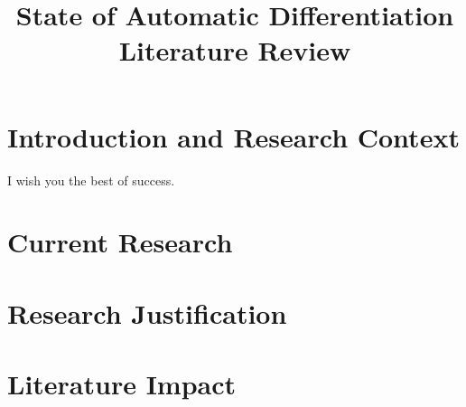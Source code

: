 \documentclass[conference,a4paper]{IEEEtran}
\begin{document}
\title{State of Automatic Differentiation\\ Literature Review}

\author{
}

\maketitle


\section{Introduction and Research Context}

I wish you the best of success. \cite{IEEEexample:article_typical}

\section{Current Research}


\section{Research Justification}

\section{Literature Impact}



\end{document}
